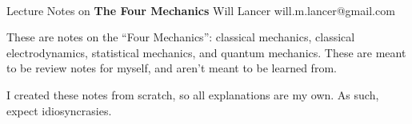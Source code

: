 \documentclass[11pt]{article}
\begin{document}
\thispagestyle{empty}
\bigskip \
\vspace{0.1cm}

\begin{center}
{\fontsize{22}{22} \selectfont Lecture Notes on}
\vskip 16pt
{\fontsize{36}{36} \selectfont \bf \sffamily The Four Mechanics}
\vskip 24pt
{\fontsize{18}{18} \selectfont \rmfamily Will Lancer} 
\vskip 6pt
{\fontsize{14}{14} \selectfont \ttfamily will.m.lancer@gmail.com} 
\vskip 24pt
\end{center}

{\parindent0pt \baselineskip=15.5pt}
\noin
These are notes on the ``Four Mechanics'': classical
mechanics, classical electrodynamics, statistical mechanics, and
quantum mechanics. These are meant to be review notes
for myself, and aren't meant to be learned from.

I created these notes from scratch, so all explanations are my own.
As such, expect idiosyncrasies.
\end{document}
